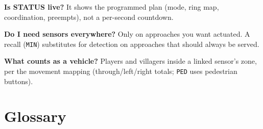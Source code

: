\documentclass[11pt]{article}
\begin{document}
\textbf{Is STATUS live?} It shows the programmed plan (mode, ring map,
coordination, preempts), not a per-second countdown.

\textbf{Do I need sensors everywhere?} Only on approaches you want actuated.
A recall (\texttt{MIN}) substitutes for detection on approaches that should always
be served.

\textbf{What counts as a vehicle?} Players and villagers inside a linked sensor's
zone, per the movement mapping (through/left/right totals; \texttt{PED} uses
pedestrian buttons).

\appendix
\section{Glossary}\label{sec:glossary}
\end{document}
